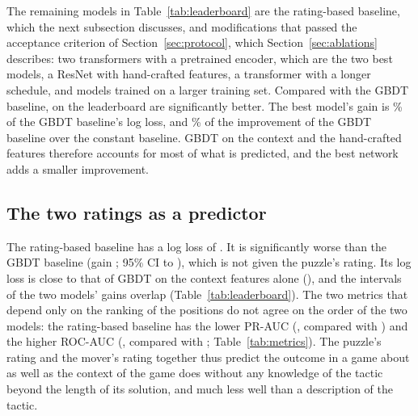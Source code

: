 \documentclass[11pt]{article}
\begin{document}
The remaining models in Table~\ref{tab:leaderboard} are the rating-based
baseline, which the next subsection discusses, and modifications that passed
the acceptance criterion of Section~\ref{sec:protocol}, which
Section~\ref{sec:ablations} describes\ifchangestart: two transformers with a
pretrained encoder, which are the two best models\fi\ifchangeconv, a
ResNet with hand-crafted features\fi\ifchangeepochs, a transformer with a
longer schedule\fi\ifmore, and models trained on a larger training
set\fi. Compared with the GBDT baseline,  on the
leaderboard are significantly better. The best model's gain is
\% of the GBDT baseline's log loss, and
\% of the improvement of the GBDT baseline over the
constant baseline. GBDT on the context and the hand-crafted features
therefore accounts for most of what is predicted, and the best network adds a
smaller improvement.

\subsection{The two ratings as a predictor}
\label{sec:rating-baseline}

The rating-based baseline  has a log loss of
. It is significantly worse than the GBDT baseline
(gain ; 95\% CI  to
), which is not given the puzzle's rating. Its
log loss is close to that of GBDT on the context features alone
(), and the intervals of the two models' gains
overlap (Table~\ref{tab:leaderboard}). The two metrics that depend only on
the ranking of the positions do not agree on the order of the two models: the
rating-based baseline has the lower PR-AUC (,
compared with ) and the higher ROC-AUC
(, compared with ;
Table~\ref{tab:metrics}). The puzzle's rating and the mover's rating together thus predict the outcome in a
game about as well as the context of the game does without any knowledge of
the tactic beyond the length of its solution, and much less well than a
description of the tactic.
\end{document}
